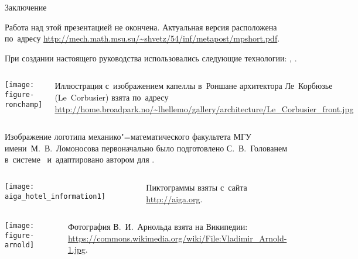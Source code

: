 \begin{frame}{Заключение}

\begin{footnotesize}

Работа над этой презентацией не окончена. Актуальная версия расположена по~адресу
\url{http://mech.math.msu.su/~shvetz/54/inf/metapost/mpshort.pdf}.

При создании настоящего руководства использовались следующие технологии:
, .

\bigskip


\begin{columns}%
\centerline{\texttt{[image: figure-ronchamp]}}
Иллюстрация с~изображением капеллы в~Роншане архитектора Ле~Корбюзье
(Le~Corbusier) взята по~адресу
\url{http://home.broadpark.no/~lhellemo/gallery/architecture/Le_Corbusier_front.jpg}

\end{columns}

\medskip

\begin{columns}[onlytextwidth]
\centerline{\scalebox{.25}{}}
Изображение логотипа механико"=математического факультета МГУ
имени М.~В.~Ломоносова первоначально было подготовлено С.~В.~Голованем
в~системе~ и~адаптировано автором для .

\end{columns}

\medskip

\begin{columns}
\centerline{\texttt{[image: aiga\_hotel\_information1]}}
Пиктограммы взяты с~сайта \url{http://aiga.org}.

\end{columns}

\medskip

\begin{columns}
\centerline{\texttt{[image: figure-arnold]}}
Фотография В.~И.~Арнольда взята на Википедии:
\url{https://commons.wikimedia.org/wiki/File:Vladimir_Arnold-1.jpg}.

\end{columns}

\end{footnotesize}
\end{frame}
